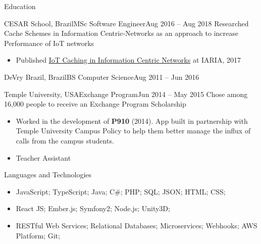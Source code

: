 \documentclass[]{mcdowellcv}
\begin{document}
	\begin{cvsection}{Education}
		\begin{cvsubsection}{CESAR School, Brazil}{MSc Software Engineer}{Aug 2016 -- Aug 2018}
            Researched Cache Schemes in Information Centric-Networks as an approach to increase Performance of IoT networks
			\begin{itemize}
                \item Published \href{https://www.thinkmind.org/index.php?view=article&articleid=icsea_2017_9_10_10019}{IoT Caching in Information Centric Networks} at IARIA, 2017
			\end{itemize}
		\end{cvsubsection}

        \begin{cvsubsection}{DeVry Brazil, Brazil}{BS Computer Science}{Aug 2011 -- Jun 2016}
        \end{cvsubsection}

        \begin{cvsubsection}{Temple University, USA}{Exchange Program}{Jun 2014 -- May 2015}
            Chose among 16,000 people to receive an Exchange Program Scholarship
            \begin{itemize}
                \item Worked in the development of \textbf{P910} (2014). App built in partnership with Temple University Campus Policy to help them better manage the influx of calls from the campus students.
                \item Teacher Assistant
            \end{itemize}
        \end{cvsubsection}
	\end{cvsection}

	\begin{cvsection}{Languages and Technologies}
		\begin{cvsubsection}{}{}{}
			\begin{itemize}
                \item JavaScript; TypeScript; Java; C\#; PHP; SQL; JSON; HTML; CSS;
                \item React JS; Ember.js; Symfony2; Node.js; Unity3D;
                \item RESTful Web Services; Relational Databases; Microservices; Webhooks; AWS Platform; Git;
			\end{itemize}
		\end{cvsubsection}
	\end{cvsection}
\end{document}
